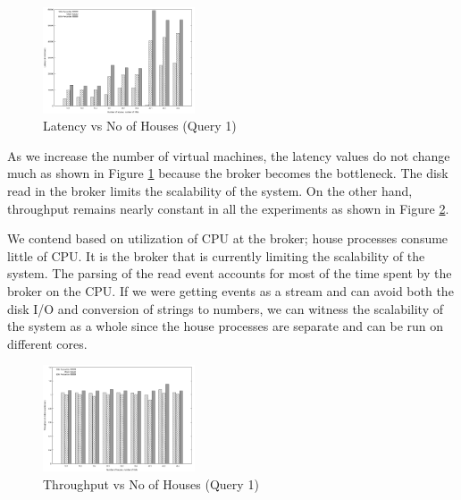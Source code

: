 \begin{figure}[h]
\begin{center}
	\includegraphics[width=0.4\textwidth]{img/q1_latency}
	\vspace*{-0.4cm}
	\caption{Latency vs No of Houses (Query 1) \label{fig:q1_latency}}
\end{center}
\vspace*{-0.3cm}
\end{figure}

As we increase the number of virtual machines, the latency values do not change much as shown in Figure \ref{fig:q1_latency} because the broker becomes the bottleneck. The disk read in the broker limits the scalability of the system. On the other hand, throughput remains nearly constant in all the experiments as shown in Figure \ref{fig:q1_throughput}.

We contend based on utilization of CPU at the broker; house processes consume little of CPU. It is the broker that is currently limiting the scalability of the system. The parsing of the read event accounts for most of the time spent by the broker on the CPU.
If we were getting events as a stream and can avoid both the disk I/O and conversion of strings to numbers, we can witness the scalability of the system as a whole since the house processes are separate and can be run on different cores.

\begin{figure}[h]
\begin{center}
	\includegraphics[width=0.4\textwidth]{img/q1_throughput}
	\vspace*{-0.4cm}
	\caption{Throughput vs No of Houses (Query 1)\label{fig:q1_throughput}}
\end{center}
\vspace*{-0.4cm}
\end{figure}